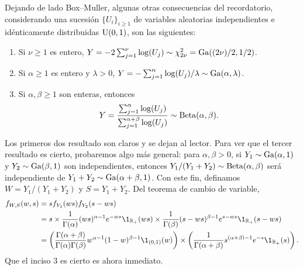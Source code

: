 Dejando de lado Box--Muller, algunas otras consecuencias del recordatorio, considerando una sucesión $\{U_i\}_{i \geq 1}$ de variables aleatorias independientes e idénticamente distribuidas $\operatorname{U}(0,1)$, son las siguientes:
\begin{enumerate}
    \item Si $\nu \geq 1$ es entero, $Y = - 2 \sum_{j = 1}^\nu \log(U_j) \sim \chi_{2\nu}^2 = \operatorname{Ga}((2\nu)/2, 1/2)$.
    \item Si $\alpha \geq 1$ es entero y $\lambda > 0$, $Y = -\sum_{j = 1}^\alpha \log(U_j) / \lambda \sim \operatorname{Ga}(\alpha, \lambda)$.
    \item Si $\alpha, \beta \geq 1$ son enteras, entonces 
    \[
        Y = \frac{\sum_{j = 1}^\alpha \log(U_j)}{\sum_{j = 1}^{\alpha+\beta} \log(U_j)} \sim \operatorname{Beta}(\alpha, \beta).
    \]
\end{enumerate}
Los primeros dos resultado son claros y se dejan al lector. Para ver que el tercer resultado es cierto, probaremos algo más general: para $\alpha, \beta > 0$, si $Y_1 \sim \operatorname{Ga}(\alpha, 1)$ y $Y_2 \sim \operatorname{Ga}(\beta, 1)$ son independientes, entonces $Y_1/(Y_1+Y_2) \sim \operatorname{Beta}(\alpha, \beta)$ será independiente de $Y_1 + Y_2 \sim \operatorname{Ga}(\alpha + \beta, 1)$. Con este fin, definamos $W = Y_1/(Y_1 + Y_2)$ y $S = Y_1 + Y_2$. Del teorema de cambio de variable, 
\begin{align*}
    f_{W, S}(w,s) & = s f_{Y_1}(ws) f_{Y_2}(s-ws) \\
    & = s \times \frac{1}{\Gamma(\alpha)} (ws)^{\alpha - 1} e^{-ws} \1_{\RR_+}(ws) \times \frac{1}{\Gamma(\beta)} (s-ws)^{\beta - 1} e^{s-ws} \1_{\RR_+}(s-ws) \\
    & = \left( \frac{\Gamma(\alpha+\beta)}{\Gamma(\alpha) \Gamma(\beta)} w^{\alpha-1} (1-w)^{\beta - 1} \1_{(0,1)}(w) \right) \times \left( \frac{1}{\Gamma(\alpha + \beta)} s^{(\alpha + \beta) - 1} e^{-s} \1_{\RR_+}(s) \right).
\end{align*}
Que el inciso 3 es cierto es ahora inmediato.